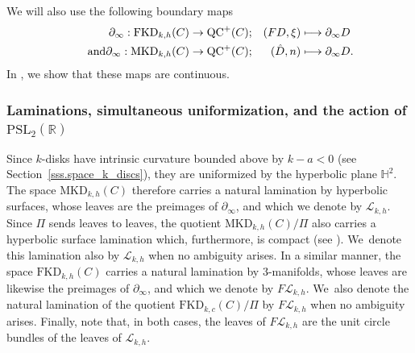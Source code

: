 \documentclass[JEP,XML,SOM,Unicode,NoEqCountersInSection,published]{cedram}
\newcommand\mto{\mathchoice{\longmapsto}{\mapsto}{\mapsto}{\mapsto}}
\newcommand{\kdisks}{$k$\nobreakdash-disks\xspace}
\theoremstyle{plain}
\theoremstyle{definition}
\newcommand\PSL{\mathrm{PSL}_2(\mathbb{R})}
\newcommand\Hd{\mathbb{H}^2}
\newcommand{\cL}{{\mathcal L}}
\newcommand{\QC}{\mathrm{QC}}
\newcommand{\MKD}{\mathrm{MKD}}
\newcommand{\FKD}{\mathrm{FKD}}
\newcommand{\bord}{\partial_{\infty}}
\begin{document}
We will also use the following boundary maps
\begin{align*}
\bord:\FKD_{k,h}(C)&\to\QC^+(C);&(FD,\xi)&\mto\bord D\\
\tag*{and}\bord:\MKD_{k,h}(C)&\to\QC^+(C);&(\hat{D},n)&\mto\bord D.
\end{align*}
In \cite{ALS}, we show that these maps are continuous.

\subsubsection{Laminations, simultaneous uniformization, and the action of $\PSL$}
\label{sssec:LaminationsSimultaneousUniformization}
Since \kdisks have intrinsic curvature bounded above by $k-a<0$ (see Section~\ref{sss.space_k_discs}), they are uniformized by the hyperbolic plane $\Hd$. The space $\MKD_{k,h}(C)$ therefore carries a natural lamination by hyperbolic surfaces, whose leaves are the preimages of $\bord$, and which we denote by $\cL_{k,h}$. Since $\Pi$ sends leaves to leaves, the quotient $\MKD_{k,h}(C)/\Pi$ also carries a hyperbolic surface lamination which, furthermore, is compact (see \cite{LabourieGAFA}). We~denote this lamination also by $\cL_{k,h}$ when no ambiguity arises. In a similar manner, the space $\FKD_{k,h}(C)$ carries a natural lamination by $3$\nobreakdash-manifolds, whose leaves are likewise the preimages of $\bord$, and which we denote by $F\cL_{k,h}$. We~also denote the natural lamination of the quotient $\FKD_{k,c}(C)/\Pi$ by $F\cL_{k,h}$ when no ambiguity arises. Finally, note that, in both cases, the leaves of $F\cL_{k,h}$ are the unit circle bundles of the leaves of $\cL_{k,h}$.
\end{document}
